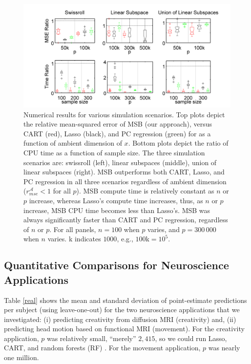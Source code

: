 \documentclass{article} %
\providecommand{\mc}[1]{\mathcal{#1}}
\begin{document}
\begin{figure}[h!]
\centering
 \vskip -20pt 
\includegraphics[width=1.0\linewidth]{../figs/boxplots.png}
 \vskip -10pt 
\caption{
Numerical results for various simulation scenarios.  Top plots depict the relative mean-squared error of MSB (our approach), versus CART (red), Lasso (black), and PC regression (green) for as a function of ambient dimension of $x$.  
Bottom plots depict the ratio of CPU time as a function of sample size.
The three simulation scenarios are: 
swissroll (left),
linear subspaces (middle), 
union of linear subspaces (right). 
MSB outperforms both CART, Lasso, and PC regression in all three scenarios regardless of ambient dimension ($r_{mse}^{\mc{A}}< 1$ for all $p$).  MSB compute time is relatively constant as $n$ or $p$ increase, whereas Lasso's compute time increases, thus, as $n$ or $p$ increase, MSB CPU time becomes less than Lasso's.  MSB was always significantly faster than CART and PC regression, regardless of $n$ or $p$.  For all panels, $n=100$ when $p$ varies, and $p=300\,000$ when $n$ varies. k indicates $1000$, e.g., $100$k$=10^5$.
} 

\label{fig:boxplots}
\end{figure}

 



\subsection{Quantitative Comparisons for Neuroscience Applications} \label{sub:real}



Table \ref{real} shows the mean and standard deviation of point-estimate predictions per subject (using leave-one-out) for the two neuroscience applications that we investigated: (i) predicting creativity from diffusion MRI (creativity) and, (ii) predicting head motion based on functional MRI (movement).  For the creativity application, $p$ was relatively small, ``merely'' $2,415$, so we could run Lasso, CART, and random forests (RF) \cite{Brieman2001}.  For the movement application, $p$ was nearly one million. 
\end{document}
